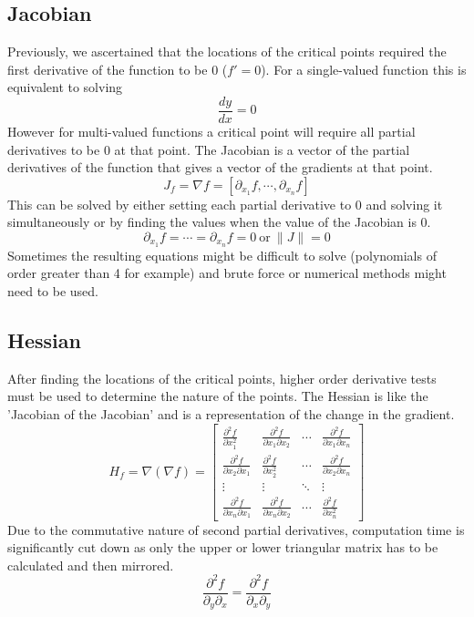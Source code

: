 \documentclass[10pt,a4paper]{report}
\begin{document}
			\subsection{Jacobian}
				Previously, we ascertained that the locations of the critical points required the first derivative of the function to be 0 ($f' = 0$).
				For a single-valued function this is equivalent to solving \[\frac{dy}{dx} = 0\]
				However for multi-valued functions a critical point will require all partial derivatives to be 0 at that point. The Jacobian \autocite{Jacobian} is
				a vector of the partial derivatives of the function that gives a vector of the gradients at that point.
				\begin{equation}
					J_f = \nabla f = [\partial_{x_1} f, \cdots, \partial_{x_n} f]
					\label{eq:jacobian}
				\end{equation}
				This can be solved by either setting each partial derivative to 0 and solving it simultaneously or by finding the values
				when the value of the Jacobian is 0. \[\partial_{x_1} f = \cdots = \partial_{x_n} f = 0 \ \textrm{or} \ \| J \| = 0 \]
				Sometimes the resulting equations might be difficult to solve (polynomials of order greater than 4 for example) and brute force or numerical methods
				might need to be used.
			\subsection{Hessian}
				After finding the locations of the critical points, higher order derivative tests must be used to determine the nature of the points.
				The Hessian \autocite{Hessian} is like the 'Jacobian of the Jacobian' and is a representation of the change in the gradient.
				\begin{equation}
					H_f = \nabla(\nabla f) =
						\begin{bmatrix}
							\frac{\partial^2 f}{\partial x_{1}^{2}} & \frac{\partial^2 f}{\partial x_1 \partial x_2} &\cdots & \frac{\partial^2 f}{\partial x_1 \partial x_n}\\
							\frac{\partial^2 f}{\partial x_2 \partial x_1} & \frac{\partial^2 f}{\partial x_{2}^{2}} & \cdots & \frac{\partial^2 f}{\partial x_2 \partial x_n}\\
							\vdots & \vdots  & \ddots & \vdots \\
							\frac{\partial^2 f}{\partial x_n \partial x_1} & \frac{\partial^2 f}{\partial x_n \partial x_2} & \cdots & \frac{\partial^2 f}{\partial x_{n}^{2}}
						\end{bmatrix}
					\label{eq:hessian}
				\end{equation}
				Due to the commutative nature of second partial derivatives, computation time is significantly cut down as only the upper or lower
				triangular matrix has to be calculated and then mirrored.
				\begin{equation}
					\frac{\partial^2 f}{\partial_y \partial_x} = \frac{\partial^2 f}{\partial_x \partial_y}
					\label{eq:symmetry}
				\end{equation}
\end{document}
